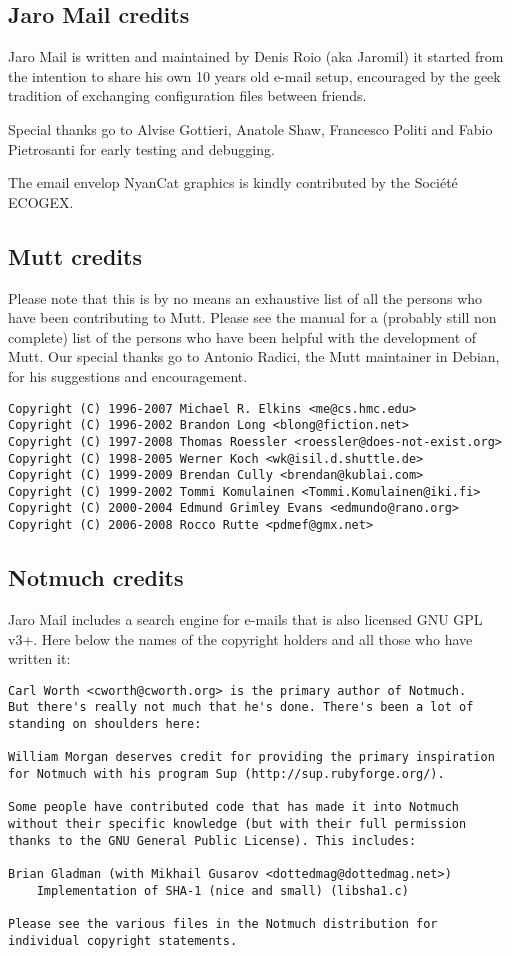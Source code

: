 \documentclass[a4,onecolumn,portrait]{article}
\begin{document}
\subsection{Jaro Mail credits}
\label{sec-13-2}

Jaro Mail is written and maintained by Denis Roio (aka Jaromil) it
started from the intention to share his own 10 years old e-mail setup,
encouraged by the geek tradition of exchanging configuration files
between friends.

Special thanks go to Alvise Gottieri, Anatole Shaw, Francesco Politi
and Fabio Pietrosanti for early testing and debugging.

The email envelop NyanCat graphics is kindly contributed by the
Société ECOGEX.
\subsection{Mutt credits}
\label{sec-13-3}

Please note that this is by no means an exhaustive list of all the
persons who have been contributing to Mutt.  Please see the
manual for a (probably still non complete) list of the persons who
have been helpful with the development of Mutt. Our special thanks go to
Antonio Radici, the Mutt maintainer in Debian, for his suggestions and
encouragement.

\begin{verbatim}
Copyright (C) 1996-2007 Michael R. Elkins <me@cs.hmc.edu>
Copyright (C) 1996-2002 Brandon Long <blong@fiction.net>
Copyright (C) 1997-2008 Thomas Roessler <roessler@does-not-exist.org>
Copyright (C) 1998-2005 Werner Koch <wk@isil.d.shuttle.de>
Copyright (C) 1999-2009 Brendan Cully <brendan@kublai.com>
Copyright (C) 1999-2002 Tommi Komulainen <Tommi.Komulainen@iki.fi>
Copyright (C) 2000-2004 Edmund Grimley Evans <edmundo@rano.org>
Copyright (C) 2006-2008 Rocco Rutte <pdmef@gmx.net>
\end{verbatim}
\subsection{Notmuch credits}
\label{sec-13-4}
Jaro Mail includes a search engine for e-mails that is also licensed
GNU GPL v3+. Here below the names of the copyright holders and all
those who have written it:

\begin{verbatim}
Carl Worth <cworth@cworth.org> is the primary author of Notmuch.
But there's really not much that he's done. There's been a lot of
standing on shoulders here:

William Morgan deserves credit for providing the primary inspiration
for Notmuch with his program Sup (http://sup.rubyforge.org/).

Some people have contributed code that has made it into Notmuch
without their specific knowledge (but with their full permission
thanks to the GNU General Public License). This includes:

Brian Gladman (with Mikhail Gusarov <dottedmag@dottedmag.net>)
	Implementation of SHA-1 (nice and small) (libsha1.c)

Please see the various files in the Notmuch distribution for
individual copyright statements.
\end{verbatim}
\end{document}
